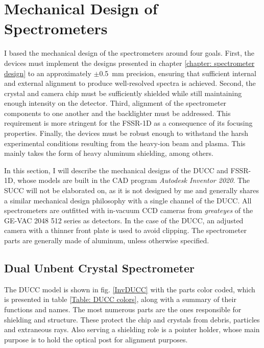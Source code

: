 \section{Mechanical Design of Spectrometers}
\label{section: mechanical design}

I based the mechanical design of the spectrometers around four goals. First, 
the devices must implement the designs presented in chapter \ref{chapter: 
spectrometer design} to an approximately $\pm$\SI{0.5}{\milli\meter} precision, 
ensuring that sufficient internal and external alignment to produce 
well-resolved spectra is achieved. Second, the crystal and camera chip must be 
sufficiently shielded while still maintaining enough intensity on the detector. 
Third, alignment of the spectrometer components to one another and the 
backlighter must be addressed. This requirement is more stringent for the 
FSSR-1D as a consequence of its focusing properties. Finally, the devices must 
be robust enough to withstand the harsh experimental conditions resulting from 
the heavy-ion beam and plasma. This mainly takes the form of heavy aluminum 
shielding, among others.

In this section, I will describe the 
mechanical designs of the DUCC and FSSR-1D, whose models are built in the CAD 
program \textit{Autodesk Inventor 2020}. The SUCC will not be elaborated on, as 
it is not designed by me and generally shares a similar mechanical design 
philosophy with a single channel of the DUCC. All spectrometers are 
outfitted with in-vacuum 
CCD cameras from \textit{greateyes} of the GE-VAC 2048 512 
series as detectors. In the case of the DUCC, an adjusted camera 
with a thinner front plate is used to avoid clipping. The 
spectrometer parts are generally made of aluminum, unless otherwise 
specified.


\subsection{Dual Unbent Crystal Spectrometer}

The DUCC model is shown in fig. \ref{InvDUCC} with the parts 
color 
coded, which is presented in table \ref{Table: DUCC colors}, 
along with 
a summary of their functions and names. The 
most numerous parts are the ones responsible for shielding and 
structure. These protect the chip and crystals from debris, 
particles 
and extraneous rays. Also serving a shielding role is a pointer 
holder, 
whose main purpose is to hold the optical post for alignment 
purposes.

